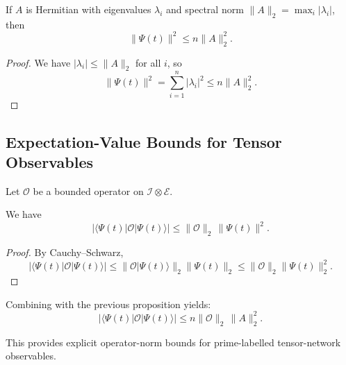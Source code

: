 \documentclass[11pt]{article}
\begin{document}
\begin{proposition}
If $A$ is Hermitian with eigenvalues $\lambda_i$ and spectral norm
$\|A\|_2=\max_i |\lambda_i|$, then
\[
\|\Psi(t)\|^2 \le n \|A\|_2^2.
\]
\end{proposition}

\begin{proof}
We have $|\lambda_i|\le \|A\|_2$ for all $i$, so
\[
\|\Psi(t)\|^2 = \sum_{i=1}^n |\lambda_i|^2 \le n \|A\|_2^2.
\]
\end{proof}

\subsection{Expectation-Value Bounds for Tensor Observables}

Let $\mathcal{O}$ be a bounded operator on $\mathcal{I}\otimes\mathcal{E}$.

\begin{lemma}
We have
\[
|\langle \Psi(t)|\mathcal{O}|\Psi(t)\rangle|
\le \|\mathcal{O}\|_2\, \|\Psi(t)\|^2.
\]
\end{lemma}

\begin{proof}
By Cauchy--Schwarz,
\[
|\langle \Psi(t)|\mathcal{O}|\Psi(t)\rangle|
\le \|\mathcal{O}|\Psi(t)\rangle\|_2 \|\Psi(t)\|_2
\le \|\mathcal{O}\|_2 \|\Psi(t)\|_2^2.
\]
\end{proof}

Combining with the previous proposition yields:
\[
|\langle \Psi(t)|\mathcal{O}|\Psi(t)\rangle|
\le n\|\mathcal{O}\|_2\,\|A\|_2^2.
\]

This provides explicit operator-norm bounds for prime-labelled
tensor-network observables.

\nocite{*}


\end{document}
